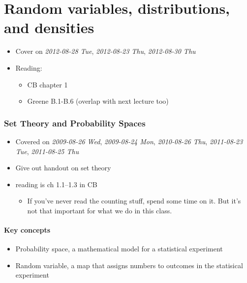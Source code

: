 
\part*{Random variables, distributions, and densities}%

\begin{itemize}
\item Cover on \textit{2012-08-28 Tue}, \textit{2012-08-23 Thu}, \textit{2012-08-30 Thu}
\item Reading:
\begin{itemize}
\item CB chapter 1
\item Greene B.1-B.6 (overlap with next lecture too)
\end{itemize}
\end{itemize}
\section{Set Theory and Probability Spaces}
\label{sec-1}

\begin{itemize}
\item Covered on \textit{2009-08-26 Wed}, \textit{2009-08-24 Mon}, \textit{2010-08-26 Thu},
      \textit{2011-08-23 Tue}, \textit{2011-08-25 Thu}
\item Give out handout on set theory
\item reading is ch 1.1--1.3 in CB
\begin{itemize}
\item If you've never read the counting
        stuff, spend some time on it.  But it's not that important for
        what we do in this class.
\end{itemize}
\end{itemize}
\subsection{Key concepts}
\label{sec-1-1}

\begin{itemize}
\item Probability space, a mathematical model for a statistical experiment
\item Random variable, a map that assigns numbers to outcomes in the
       statisical experiment
\end{itemize}

